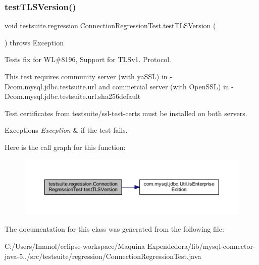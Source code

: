 \subsubsection{\texorpdfstring{test\+T\+L\+S\+Version()}{testTLSVersion()}}
{\footnotesize\ttfamily void testsuite.\+regression.\+Connection\+Regression\+Test.\+test\+T\+L\+S\+Version (\begin{DoxyParamCaption}{ }\end{DoxyParamCaption}) throws Exception}

Tests fix for WL\#8196, Support for T\+L\+Sv1. Protocol.

This test requires community server (with ya\+S\+SL) in -\/\+Dcom.\+mysql.\+jdbc.\+testsuite.\+url and commercial server (with Open\+S\+SL) in -\/\+Dcom.\+mysql.\+jdbc.\+testsuite.\+url.\+sha256default

Test certificates from testsuite/ssl-\/test-\/certs must be installed on both servers.


\begin{DoxyExceptions}{Exceptions}
{\em Exception} & if the test fails. \\
\hline
\end{DoxyExceptions}
Here is the call graph for this function\+:
\nopagebreak
\begin{figure}[H]
\begin{center}
\leavevmode
\includegraphics[width=350pt]{classtestsuite_1_1regression_1_1_connection_regression_test_a8a5b38389d6365d90769f30887196749_cgraph}
\end{center}
\end{figure}


The documentation for this class was generated from the following file\+:\begin{DoxyCompactItemize}
\item 
C\+:/\+Users/\+Imanol/eclipse-\/workspace/\+Maquina Expendedora/lib/mysql-\/connector-\/java-\/5../src/testsuite/regression/Connection\+Regression\+Test.\+java\end{DoxyCompactItemize}
